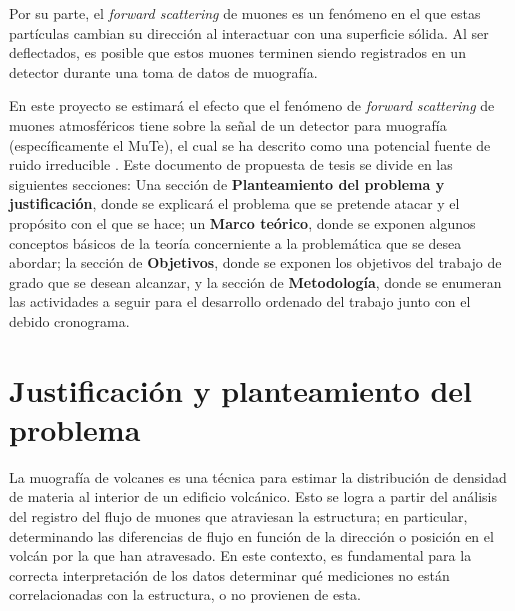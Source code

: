 \documentclass[12pt]{report}
\begin{document}
Por su parte, el \textit{forward scattering} de muones es un fenómeno en el que estas partículas cambian su dirección al interactuar con una superficie sólida. Al ser deflectados, es posible que estos muones terminen siendo registrados en un detector durante una toma de datos de muografía.

En este proyecto se estimará el efecto que el fenómeno de \textit{forward scattering} de muones atmosféricos tiene sobre la señal de un detector para muografía (específicamente el MuTe), el cual se ha descrito como una potencial fuente de ruido irreducible \cite{gomez2017forward}. Este documento de propuesta de tesis se divide en las siguientes secciones: Una sección de \textbf{Planteamiento del problema y justificación}, donde se explicará el problema que se pretende atacar y el propósito con el que se hace; un \textbf{Marco teórico}, donde se exponen algunos conceptos básicos de la teoría concerniente a la problemática que se desea abordar; la sección de \textbf{Objetivos}, donde se exponen los objetivos del trabajo de grado que se desean alcanzar, y la sección de \textbf{Metodología}, donde se enumeran las actividades a seguir para el desarrollo ordenado del trabajo junto con el debido cronograma.


\section*{Justificación y planteamiento del problema}

La muografía de volcanes es una técnica para estimar la distribución de densidad de materia al interior de un edificio volcánico. Esto se logra a partir del análisis del registro del flujo de muones que atraviesan la estructura; en particular, determinando las diferencias de flujo en función de la dirección o posición en el volcán por la que han atravesado. En este contexto, es fundamental para la correcta interpretación de los datos determinar qué mediciones no están correlacionadas con la estructura, o no provienen de esta.
\end{document}
